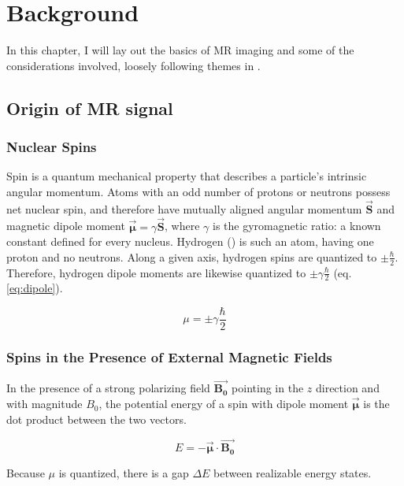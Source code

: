 \newcommand{\uvec}[1]{\bm{\hat{#1}}}
\newcommand{\bvec}[1]{\bm{\vec{#1}}}

\chapter{Background}
In this chapter, I will lay out the basics of MR imaging and some of the considerations involved, loosely following
themes in \cite{nishimura}.

\section{Origin of MR signal}

\subsection{Nuclear Spins}
Spin is a quantum mechanical property that describes a particle's intrinsic angular momentum. Atoms with an odd
number of protons or neutrons possess net nuclear spin, and therefore have mutually aligned angular momentum $\bvec{S}$
and magnetic dipole moment $\bvec{\mu}= \gamma \bvec{S}$, where $\gamma$ is the gyromagnetic ratio: a known constant
defined for every nucleus. Hydrogen () is such an atom, having one proton and no neutrons. Along a given
axis, hydrogen spins are quantized to $\pm \frac{\hbar}2$.  Therefore, hydrogen dipole moments are likewise quantized to
$\pm \gamma \frac{\hbar}{2}$ (eq. \ref{eq:dipole}).

\begin{equation}\label{eq:dipole}
    \mu = \pm \gamma \frac{\hbar}{2}
\end{equation}

\subsection{Spins in the Presence of External Magnetic Fields}
In the presence of a strong polarizing field $\bvec{B_0}$ pointing in the $z$ direction and with magnitude $B_0$, the
potential energy of a spin with dipole moment $\bvec{\mu}$ is the dot product between the two vectors.

\begin{equation}\label{eq:spin_energy}
    E = - \bvec{\mu} \cdot \bvec{B_0}
\end{equation}

Because $\mu$ is quantized, there is a gap $\Delta E$ between realizable energy states.

